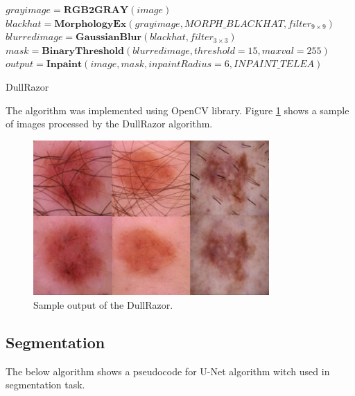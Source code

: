 \documentclass[12pt]{diazessay}
\begin{document}
    
    \begin{algorithm}[H]
        \DontPrintSemicolon
    
    
        $grayimage = \mathbf{RGB2GRAY}(image)$\;
        $blackhat = \mathbf{MorphologyEx}(grayimage, MORPH\_BLACKHAT, filter_{9\times9})$\;
        $blurredimage = \mathbf{GaussianBlur}(blackhat, filter_{3\times3})$\;
        $mask = \mathbf{BinaryThreshold}(blurredimage, threshold=15, maxval=255)$\;
        $output = \mathbf{Inpaint}(image, mask, inpaintRadius = 6, INPAINT\_TELEA)$\; 
        
        \caption{DullRazor}
    \end{algorithm} 

    The algorithm was implemented using OpenCV library. Figure \ref{fig:DullRazorOutput} shows a sample of images processed by the DullRazor algorithm. 

    \begin{figure}[htp]
        \centering
        \includegraphics[width=9cm]{Figures/DullRazorOutput.jpg}
        \caption[Sample output of the DullRazor]{Sample output of the DullRazor.}
        \label{fig:DullRazorOutput}
    \end{figure}
    
    \subsection{Segmentation}
    \hspace{0.7cm} The below algorithm shows a pseudocode for U-Net algorithm witch used in segmentation task.\\
\end{document}
